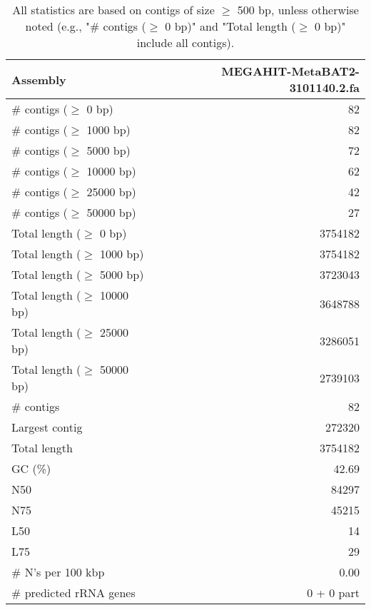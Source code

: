 \documentclass[12pt,a4paper]{article}
\begin{document}
\begin{table}[ht]
\begin{center}
\caption{All statistics are based on contigs of size $\geq$ 500 bp, unless otherwise noted (e.g., "\# contigs ($\geq$ 0 bp)" and "Total length ($\geq$ 0 bp)" include all contigs).}
\begin{tabular}{|l*{1}{|r}|}
\hline
Assembly & MEGAHIT-MetaBAT2-3101140.2.fa \\ \hline
\# contigs ($\geq$ 0 bp) & 82 \\ \hline
\# contigs ($\geq$ 1000 bp) & 82 \\ \hline
\# contigs ($\geq$ 5000 bp) & 72 \\ \hline
\# contigs ($\geq$ 10000 bp) & 62 \\ \hline
\# contigs ($\geq$ 25000 bp) & 42 \\ \hline
\# contigs ($\geq$ 50000 bp) & 27 \\ \hline
Total length ($\geq$ 0 bp) & 3754182 \\ \hline
Total length ($\geq$ 1000 bp) & 3754182 \\ \hline
Total length ($\geq$ 5000 bp) & 3723043 \\ \hline
Total length ($\geq$ 10000 bp) & 3648788 \\ \hline
Total length ($\geq$ 25000 bp) & 3286051 \\ \hline
Total length ($\geq$ 50000 bp) & 2739103 \\ \hline
\# contigs & 82 \\ \hline
Largest contig & 272320 \\ \hline
Total length & 3754182 \\ \hline
GC (\%) & 42.69 \\ \hline
N50 & 84297 \\ \hline
N75 & 45215 \\ \hline
L50 & 14 \\ \hline
L75 & 29 \\ \hline
\# N's per 100 kbp & 0.00 \\ \hline
\# predicted rRNA genes & 0 + 0 part \\ \hline
\end{tabular}
\end{center}
\end{table}
\end{document}
